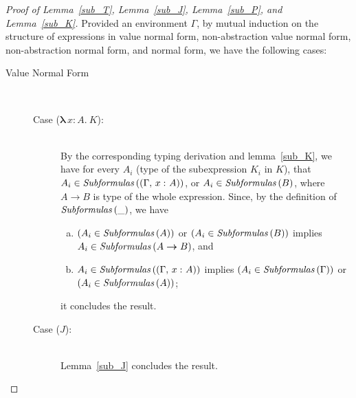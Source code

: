 \documentclass[a4paper]{article}
\newcommand{\typecolor}{}
\newcommand{\termcolor}{}
\newcommand{\tp}[1]{{\typecolor #1}}
\newcommand{\tm}[1]{{\termcolor #1}}
\newcommand{\typarr}[2]{#1\boldsymbol{\rightarrow}#2}
\newcommand{\expabs}[3]{\boldsymbol{\lambda}\,#1\boldsymbol{\colon}#2\boldsymbol{.}\ #3}
\newcommand{\typing}[2]{\tm{#1:\ }\tp{#2}}
\newcommand{\typenvcon}[2]{\tp{\Gamma,}\ \typing{#1}{#2}}
\newcommand{\txt}[1]{\text{\textit{#1}}}
\newcommand{\subformulas}[1]{\txt{Subformulas}\,(#1)}
\begin{document}
\begin{proof}[Proof of Lemma~\ref{sub_T}, Lemma~\ref{sub_J}, Lemma~\ref{sub_P}, and Lemma~\ref{sub_K}]
Provided an environment $\Gamma$, by mutual induction on the structure
of expressions in value normal form, non-abstraction value normal
form, non-abstraction normal form, and normal form, we have the
following cases:

\begin{description}

\item[Value Normal Form]\ \\
\begin{description}
\item[Case ($\expabs{x}{A}{K}$):]\ \\ 
  By the corresponding typing derivation and lemma~\ref{sub_K}, we
  have for every $A_i$ (type of the subexpression $K_i$ in $K$), that
  $A_i \in \subformulas{(\typenvcon{x}{A})}$, or $A_i \in
  \subformulas{B}$, where $\typarr{A}{B}$ is type of the whole
  expression. Since, by the definition of $\subformulas{\_}$, we have
  \begin{enumerate}[(a)] 
     \item $(A_i \in \subformulas{A})$ or $(A_i \in \subformulas{B})$ implies $A_i \in \subformulas{\typarr{A}{B}}$, and
     \item $A_i \in \subformulas{(\typenvcon{x}{A})}$ implies $(A_i \in \subformulas{\Gamma})$ or $(A_i \in \subformulas{A})$;
  \end{enumerate}
  it concludes the result.
\item[Case ($J$):]\ \\
  Lemma~\ref{sub_J} concludes the result.   
\end{description}


\end{description}
\end{proof}
\end{document}
